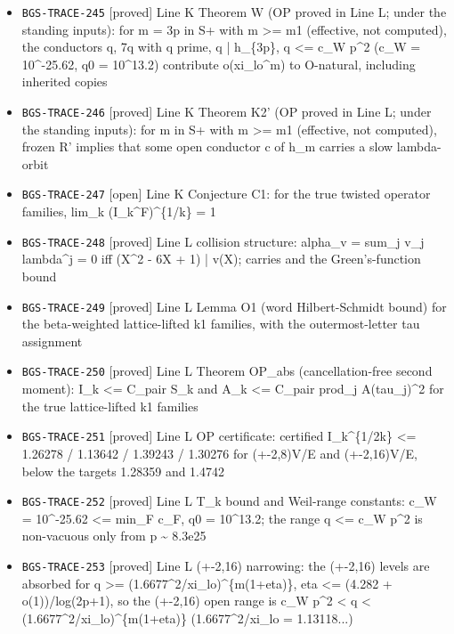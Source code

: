 \begin{itemize}
  \item \texttt{BGS-TRACE-245} [proved] Line K Theorem W (OP proved in Line L; under the standing inputs): for m = 3p in S+ with m >= m1 (effective, not computed), the conductors q, 7q with q prime, q | h\_\{3p\}, q <= c\_W p\textasciicircum{}2 (c\_W = 10\textasciicircum{}-25.62, q0 = 10\textasciicircum{}13.2) contribute o(xi\_lo\textasciicircum{}m) to O-natural, including inherited copies
  \item \texttt{BGS-TRACE-246} [proved] Line K Theorem K2' (OP proved in Line L; under the standing inputs): for m in S+ with m >= m1 (effective, not computed), frozen R' implies that some open conductor c of h\_m carries a slow lambda-orbit
  \item \texttt{BGS-TRACE-247} [open] Line K Conjecture C1: for the true twisted operator families, lim\_k (I\_k\textasciicircum{}F)\textasciicircum{}\{1/k\} = 1
  \item \texttt{BGS-TRACE-248} [proved] Line L collision structure: alpha\_v = sum\_j v\_j lambda\textasciicircum{}j = 0 iff (X\textasciicircum{}2 - 6X + 1) | v(X); carries and the Green's-function bound
  \item \texttt{BGS-TRACE-249} [proved] Line L Lemma O1 (word Hilbert-Schmidt bound) for the beta-weighted lattice-lifted k1 families, with the outermost-letter tau assignment
  \item \texttt{BGS-TRACE-250} [proved] Line L Theorem OP\_abs (cancellation-free second moment): I\_k <= C\_pair S\_k and A\_k <= C\_pair prod\_j A(tau\_j)\textasciicircum{}2 for the true lattice-lifted k1 families
  \item \texttt{BGS-TRACE-251} [proved] Line L OP certificate: certified I\_k\textasciicircum{}\{1/2k\} <= 1.26278 / 1.13642 / 1.39243 / 1.30276 for (+-2,8)V/E and (+-2,16)V/E, below the targets 1.28359 and 1.4742
  \item \texttt{BGS-TRACE-252} [proved] Line L T\_k bound and Weil-range constants: c\_W = 10\textasciicircum{}-25.62 <= min\_F c\_F, q0 = 10\textasciicircum{}13.2; the range q <= c\_W p\textasciicircum{}2 is non-vacuous only from p \textasciitilde{} 8.3e25
  \item \texttt{BGS-TRACE-253} [proved] Line L (+-2,16) narrowing: the (+-2,16) levels are absorbed for q >= (1.6677\textasciicircum{}2/xi\_lo)\textasciicircum{}\{m(1+eta)\}, eta <= (4.282 + o(1))/log(2p+1), so the (+-2,16) open range is c\_W p\textasciicircum{}2 < q < (1.6677\textasciicircum{}2/xi\_lo)\textasciicircum{}\{m(1+eta)\} (1.6677\textasciicircum{}2/xi\_lo = 1.13118...)

\end{itemize}
